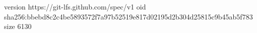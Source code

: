 version https://git-lfs.github.com/spec/v1
oid sha256:bbebd8c2c4be5893572f7a97b52519e817d02195d2b304d25815c9b45ab5f783
size 6130
